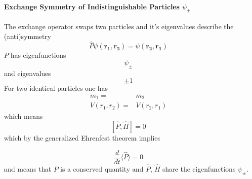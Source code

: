\paragraph[Exchange Symmetry of psi]{Exchange Symmetry of Indistinguishable Particles $\psi_{\pm}$}


The exchange operator swaps two particles and it's eigenvalues describe the (anti)symmetry
\begin{equation*}
    \widehat{P}\psi(\mathbf{r_1},\mathbf{r_2})=\psi(\mathbf{r_2},\mathbf{r_1})
\end{equation*}
$P$ has eigenfunctions
\begin{equation*}
    \psi_{\pm}
\end{equation*}
and eigenvalues
\begin{equation*}
    \pm 1
\end{equation*}
For two identical particles one has
\begin{align*}
    m_1=        & m_2        \\
    V(r_1,r_2)= & V(r_2,r_1)
\end{align*}
which means
\begin{equation*}
    \left[\widehat{P},\widehat{H}\right]=0
\end{equation*}
which by the generalized Ehrenfest theorem implies

\begin{equation*}
    \frac{d}{dt}\langle\widehat{P}\rangle=0
\end{equation*}
and means that $P$ is a conserved quantity and $\widehat{P}$, $\widehat{H}$ share the eigenfunctions $\psi_{\pm}$.


